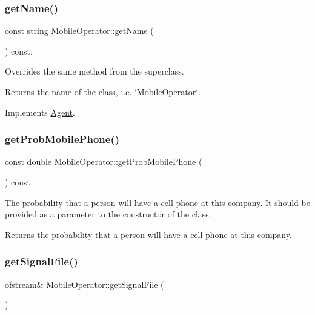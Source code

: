 \subsubsection{\texorpdfstring{get\+Name()}{getName()}}
{\footnotesize\ttfamily const string Mobile\+Operator\+::get\+Name (\begin{DoxyParamCaption}{ }\end{DoxyParamCaption}) const\hspace{0.3cm}{\ttfamily [override]}, {\ttfamily [virtual]}}

Overrides the same method from the superclass. \begin{DoxyReturn}{Returns}
the name of the class, i.\+e. \char`\"{}\+Mobile\+Operator\char`\"{}. 
\end{DoxyReturn}


Implements \hyperlink{class_agent_afe6c72d91baf9ee4fe77ea1ed7fef3ba}{Agent}.

\mbox{\label{class_mobile_operator_afe59edb4ba22cea7fab968fdd1e2ce31}} 
\subsubsection{\texorpdfstring{get\+Prob\+Mobile\+Phone()}{getProbMobilePhone()}}
{\footnotesize\ttfamily const double Mobile\+Operator\+::get\+Prob\+Mobile\+Phone (\begin{DoxyParamCaption}{ }\end{DoxyParamCaption}) const}

The probability that a person will have a cell phone at this company. It should be provided as a parameter to the constructor of the class. \begin{DoxyReturn}{Returns}
the probability that a person will have a cell phone at this company. 
\end{DoxyReturn}
\mbox{\label{class_mobile_operator_ac39217182fd0ce7ef5da3b9018bcb965}} 
\subsubsection{\texorpdfstring{get\+Signal\+File()}{getSignalFile()}}
{\footnotesize\ttfamily ofstream\& Mobile\+Operator\+::get\+Signal\+File (\begin{DoxyParamCaption}{ }\end{DoxyParamCaption})}

